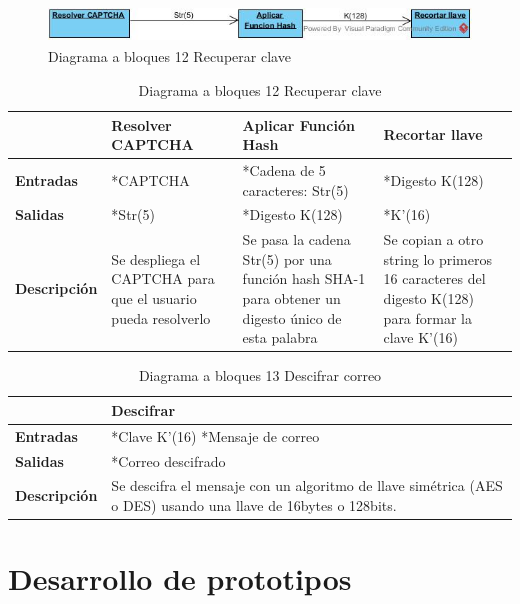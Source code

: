\documentclass[12pt,oneside,onecolumn,openany]{report}
\begin{document}
\begin{figure}[H]
	\includegraphics[width=1\linewidth, height=1cm]{./images/bloques12.jpg}
	\caption{Diagrama a bloques 12 Recuperar clave}
	\label{fig:5-12-1}
\end{figure}
\begin{table}[H]
 \centering
   {
     \begin{tabular}{| p{} | p{3cm} | p{3cm} | p{3cm} |}
     \hline
     & \textbf{Resolver CAPTCHA} & \textbf{Aplicar Función Hash} & \textbf{Recortar llave}\\
     \hline
     \textbf{Entradas} & *CAPTCHA & *Cadena de 5 caracteres: Str(5) & *Digesto K(128)\\
     \hline
     \textbf{Salidas} & *Str(5) & *Digesto K(128) & *K’(16)\\
     \hline
     \textbf{Descripción} & Se despliega el CAPTCHA para que el usuario pueda resolverlo & Se pasa la cadena Str(5) por una función hash SHA-1 para obtener un digesto único de esta palabra & Se copian a otro string lo primeros 16 caracteres del digesto K(128) para formar la clave K’(16)\\

    \end{tabular}
    }
    \caption{Diagrama a bloques 12 Recuperar clave}
    \label{tabla:b12}
\end{table}
\begin{table}[H]
 \centering
   {
     \begin{tabular}{| p{} | p{3cm} |}
     \hline
     & \textbf{Descifrar}\\
     \hline
     \textbf{Entradas} & *Clave K’(16) *Mensaje de correo\\
     \hline
     \textbf{Salidas} & *Correo descifrado\\
     \hline
     \textbf{Descripción} & Se descifra el mensaje con un algoritmo de llave simétrica (AES o DES) usando una llave de 16bytes o 128bits.\\

    \end{tabular}
    }
    \caption{Diagrama a bloques 13 Descifrar correo}
    \label{tabla:b13}
\end{table}

\chapter{Desarrollo de prototipos}
\end{document}
